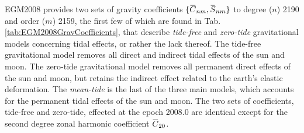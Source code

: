 \documentclass[11pt,dvipsnames]{thesis}
\newcommand{\overbar}[1]{\mkern 1.5mu\overline{\mkern-1.5mu#1\mkern-1.5mu}\mkern 1.5mu}
\begin{document}
EGM2008 provides two sets of gravity coefficients $\{\overbar{C}_{nm}, \overbar{S}_{nm}\}$ to degree ($n$) 2190 and order ($m$) 2159, the first few of which are found in Tab. \ref{tab:EGM2008GravCoefficients}, that describe \textit{tide-free} and \textit{zero-tide} gravitational models concerning tidal effects, or rather the lack thereof.
The tide-free gravitational model removes all direct and indirect tidal effects of the sun and moon. The zero-tide gravitational model removes all permanent direct effects of the sun and moon, but retains the indirect effect related to the earth's elastic deformation. The \textit{mean-tide} is the last of the three main models, which accounts for the permanent tidal effects of the sun and moon.
%
The two sets of coefficients, tide-free and zero-tide, effected at the epoch 2008.0 are identical except for the second degree zonal harmonic coefficient $\overbar{C}_{20}$.
 
\end{document}
